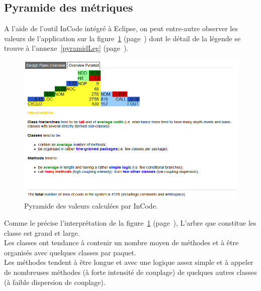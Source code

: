 \documentclass[12pt,a4paper,final]{article}
\newcommand{\annexe}[1]{annexe~\ref{#1} (page~\pageref{#1})}
\newcommand{\labelfigure}[1]{figure~\ref{#1} (page~\pageref{#1})}
\begin{document}
\subsection{Pyramide des métriques}
A l'aide de l'outil InCode intégré à Eclipse, on peut entre-autre observer les valeurs de l'application sur la \labelfigure{pyramid} dont le détail de la légende se trouve à l'\annexe{pyramidLeg}.
\begin{figure}[!h]
	\centering
	\includegraphics[width=\textwidth]{InCodePyramid.png}
	\caption{\label{pyramid}Pyramide des valeurs calculées par InCode.}
\end{figure}
Comme le précise l'interprétation de la \labelfigure{pyramid}, L'arbre que constitue les classe est grand et large.\\
Les classes ont tendance à contenir un nombre moyen de méthodes et à être organisés avec quelques classes par paquet.\\
Les méthodes tendent à être longue et avec une logique assez simple et à appeler de nombreuses méthodes (à forte intensité de couplage) de quelques autres classes (à faible dispersion de couplage).

\clearpage
\end{document}
